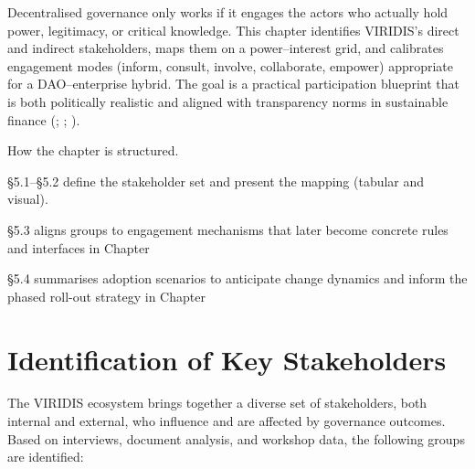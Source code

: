 \documentclass[
  english,
  12pt,
  oneside,
  open=any]{scrbook}
\begin{document}
Decentralised governance only works if it engages the actors who
actually hold power, legitimacy, or critical knowledge. This chapter
identifies VIRIDIS's direct and indirect stakeholders, maps them on a
power--interest grid, and calibrates engagement modes (inform, consult,
involve, collaborate, empower) appropriate for a DAO--enterprise hybrid.
The goal is a practical participation blueprint that is both politically
realistic and aligned with transparency norms in sustainable finance
(;
; ).

How the chapter is structured.

§5.1--§5.2 define the stakeholder set and present the mapping (tabular
and visual).

§5.3 aligns groups to engagement mechanisms that later become concrete
rules and interfaces in Chapter

§5.4 summarises adoption scenarios to anticipate change dynamics and
inform the phased roll-out strategy in Chapter

\section{Identification of Key Stakeholders}\label{sec-ident}

The VIRIDIS ecosystem brings together a diverse set of stakeholders,
both internal and external, who influence and are affected by governance
outcomes. Based on interviews, document analysis, and workshop data, the
following groups are identified:
\end{document}
